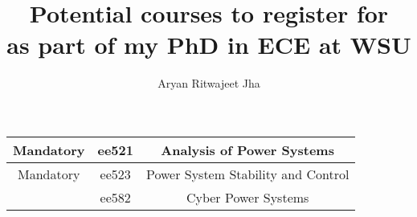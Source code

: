 \documentclass{article}
\author{Aryan Ritwajeet Jha}
\date{}
\title{Potential courses to register for \\ as part of my PhD in ECE at WSU}
\begin{document}
	\maketitle
	
	\begin{tabular}{|c|c|c|}
		\hline
		Mandatory & ee521 & Analysis of Power Systems \\
		\hline
		Mandatory & ee523 & Power System Stability and Control \\
		 & ee582 & Cyber Power Systems \\
		
		\hline
	\end{tabular}
\end{document}
